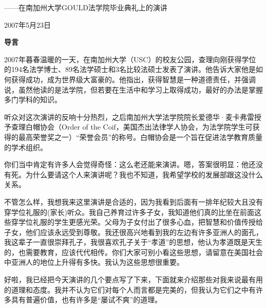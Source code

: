 \cleardoublepage
\renewcommand{\bookchapter}{2}

{\kaishu{}\centering ——在南加州大学GOULD法学院毕业典礼上的演讲\par}

{\kaishu\raggedleft 2007年5月23日\par}

\begin{LectureIntro}
\textbf{导言}
\par

{\kaishu 2007年暮春温暖的一天，在南加州大学（USC）的校友公园，查理向刚获得学位的194名法学博士、89名法学硕士和3名比较法硕士发表了演讲。他告诉大家他是如何获得成功，成为世界级大富豪的。他指出，获得智慧是一种道德责任，并强调说，虽然他读的是法学院，但若要在生活中和学习上取得成功，最好的办法是掌握多门学科的知识。}
\par

{\kaishu 听众对这次演讲的反响十分热烈，之后南加州大学法学院院长爱德华·麦卡弗雷授予查理白帽协会（Order of the Coif，美国杰出法律学人协会，为法学院学生可获得的最高荣誉奖之一）“荣誉会员”的称号。白帽协会是一个旨在促进法学教育质量的学术组织。}
\par
\end{LectureIntro}

\clearpage
你们当中肯定有许多人会觉得奇怪：这么老还能来演讲。嗯，答案很明显：他还没有死。为什么要请这个人来演讲呢？我也不知道，我希望学校的发展部跟这没什么关系。
\par

不管怎么样，我想我来这里演讲是合适的，因为我看到后面有一排年纪较大且没有穿学位礼服的(家长)听众。我自己养育过许多子女，我知道他们真的比坐在前面这些穿学位礼服的学生更感光荣。父母为子女付出了很多心血，把智慧和价值传授给子女，他们应该永远受到尊敬。我还很高兴地看到我的左边有许多亚洲人的面孔，我这辈子一直很崇拜孔子，我很喜欢孔子关于“孝道”的思想，他认为孝道既是天生的，也需要教育，应该代代相传。你们大家可别小看这些思想，请留意在美国社会中亚洲人的地位上升得有多快。我认为这些思想很重要。
\par

好啦，我已经把今天演讲的几个要点写了下来，下面就来介绍那些对我来说最有用的道理和态度。我并不认为它们对每个人而言都是完美的，但我认为它们之中有许多具有普遍价值，也有许多是“屡试不爽”的道理。
\par

